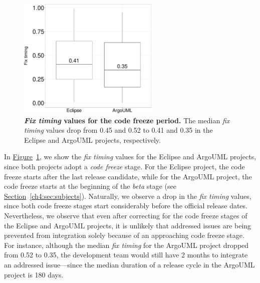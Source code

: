 \begin{figure} \center \includegraphics[width=0.60\textwidth,keepaspectratio]
	{chapters/chapter4/figures/as_codefreeze.pdf} \caption{\textbf{{\em Fix timing} values for
		the code freeze period.} The median {\em fix timing} values drop
		from 0.45 and 0.52 to 0.41 and 0.35 in the Eclipse and ArgoUML
projects, respectively. } \label{ch4:fig:codefreeze_allsystems} \end{figure}

In \hyperref[ch4:fig:codefreeze_allsystems]{Figure}~\ref{ch4:fig:codefreeze_allsystems},
we show the {\em fix timing} values for the Eclipse and ArgoUML projects, since
both projects adopt a {\em code freeze} stage. For the Eclipse project, the code
freeze starts after the last release candidate, while for the ArgoUML project,
the code freeze starts at the beginning of the {\em beta} stage (see
\hyperref[ch4:sec:subjects]{Section}~\ref{ch4:sec:subjects}). Naturally, we observe a
drop in the {\em fix timing} values, since both code freeze stages start considerably
before the official release dates. Nevertheless, we observe that even after correcting for
the code freeze stages of the Eclipse and ArgoUML projects, it is unlikely
that addressed issues are being prevented from integration solely because of an approaching code
freeze stage. For instance, although the median {\em fix timing} for the ArgoUML project
dropped from 0.52 to 0.35, the development team would still have 2 months to
integrate an addressed issue---since the median duration of a release cycle in the
ArgoUML project is 180 days.



